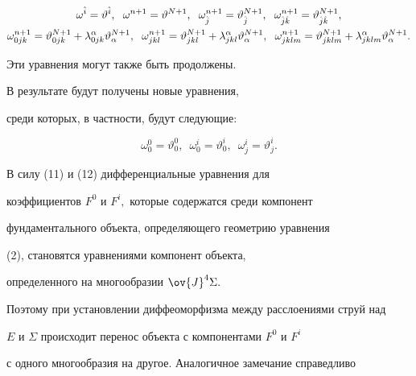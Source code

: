 \begin{gather}


\omega^{\Hat{i}}=\vartheta^{\Hat{i}}, \ \; \omega^{n+1}=\vartheta^{N+1}, \ \;


\omega^{n+1}_{\Hat{j}}=\vartheta^{N+1}_{\Hat{j}},\ \;


\omega^{n+1}_{\Hat{j}\Hat{k}}=\vartheta^{N+1}_{\Hat{j}\Hat{k}}, \\


%


\omega^{n+1}_{0jk}=\vartheta^{N+1}_{0jk}+


\lambda^{\alpha}_{0jk}\vartheta^{N+1}_\alpha, \ \;


\omega^{n+1}_{jkl}=\vartheta^{N+1}_{jkl}+


\lambda^\alpha_{jkl}\vartheta^{N+1}_\alpha, \ \;


\omega^{n+1}_{jklm}=\vartheta^{N+1}_{jklm}+


\lambda^\alpha_{jklm}\vartheta^{N+1}_\alpha.\notag 


\end{gather}


Эти уравнения могут также быть продолжены. 


В результате будут получены новые уравнения,


среди которых, в частности, будут следующие:


\begin{equation}


\omega^0_0=\vartheta^0_0, \ \;


\omega^i_0=\vartheta^i_0, \ \; \omega^i_j=\vartheta^i_j.


\end{equation}





В силу (11) и (12) дифференциальные уравнения для 


коэффициентов $F^0$ и $F^i,$ которые содержатся среди компонент 


фундаментального объекта, определяющего геометрию уравнения


(2), становятся уравнениями компонент объекта, 


определенного на многообразии $\ov{J}^4\Sigma.$


Поэтому при установлении диффеоморфизма между расслоениями струй над


$E$ и $\Sigma$ происходит перенос объекта с компонентами $F^0$ и $F^i$


с одного многообразия на другое. Аналогичное замечание справедливо 


